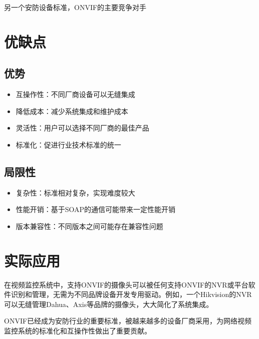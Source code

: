 \documentclass[12pt,UTF8]{ctexbook}
\begin{document}
另一个安防设备标准，ONVIF的主要竞争对手

\chapter{优缺点}

\section{优势}

\begin{itemize}
  \item 互操作性：不同厂商设备可以无缝集成
  \item 降低成本：减少系统集成和维护成本
  \item 灵活性：用户可以选择不同厂商的最佳产品
  \item 标准化：促进行业技术标准的统一
\end{itemize}

\section{局限性}

\begin{itemize}
  \item 复杂性：标准相对复杂，实现难度较大
  \item 性能开销：基于SOAP的通信可能带来一定性能开销
  \item 版本兼容性：不同版本之间可能存在兼容性问题
\end{itemize}

\chapter{实际应用}

在视频监控系统中，支持ONVIF的摄像头可以被任何支持ONVIF的NVR或平台软件识别和管理，无需为不同品牌设备开发专用驱动。例如，一个Hikvision的NVR可以无缝管理Dahua、Axis等品牌的摄像头，大大简化了系统集成。

ONVIF已经成为安防行业的重要标准，被越来越多的设备厂商采用，为网络视频监控系统的标准化和互操作性做出了重要贡献。

\backmatter
\end{document}

